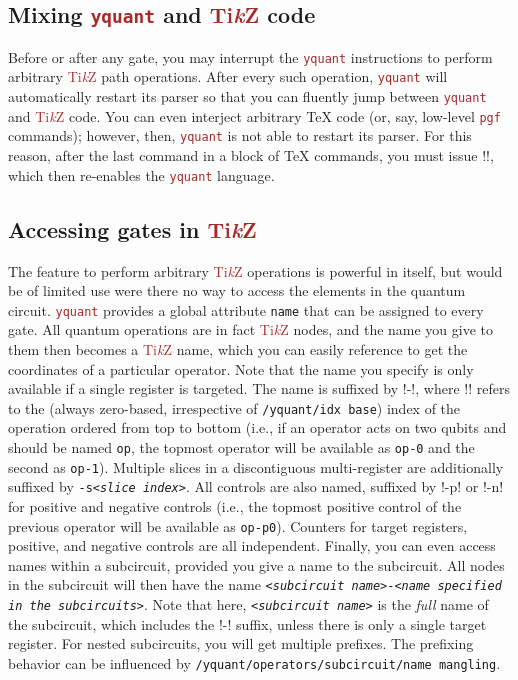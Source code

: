 \documentclass{scrartcl}
\def\TikZ{\textcolor{brown}{Ti\textit kZ}}
\def\pkg#1{\textcolor{brown}{\texttt{#1}}}
\def\ttlink{\link\texttt}
\def\Yquant{\pkg{yquant}}
\begin{document}
      \subsection{Mixing \texorpdfstring{\Yquant}{yquant} and \texorpdfstring{\TikZ}{TikZ} code}
         \linkdef\yquant
         Before or after any gate, you may interrupt the \Yquant{} instructions to perform arbitrary \TikZ{} path operations.
         After every such operation, \Yquant{} will automatically restart its parser so that you can fluently jump between \Yquant{} and \TikZ{} code.
         You can even interject arbitrary \TeX{} code (or, say, low\hyp level \pkg{pgf} commands); however, then, \Yquant{} is not able to restart its parser.
         For this reason, after the last command in a block of \TeX{} commands, you must issue \tex!\yquant!, which then re\hyp enables the \Yquant{} language.

      \subsection{Accessing gates in \texorpdfstring{\TikZ}{TikZ}}
         The feature to perform arbitrary \TikZ{} operations is powerful in itself, but would be of limited use were there no way to access the elements in the quantum circuit.
         \Yquant{} provides a global attribute \texttt{name} that can be assigned to every gate.
         All quantum operations are in fact \TikZ{} nodes, and the name you give to them then becomes a \TikZ{} name, which you can easily reference to get the coordinates of a particular operator.
         Note that the name you specify is only available if a single register is targeted.
         The name is suffixed by \tex!-\idx!, where \tex!\idx! refers to the (always zero\hyp based, irrespective of \ttlink{/yquant/idx base}) index of the operation ordered from top to bottom (i.e., if an operator acts on two qubits and should be named \texttt{op}, the topmost operator will be available as \texttt{op-0} and the second as \texttt{op-1}).
         Multiple slices in a discontiguous multi\hyp register are additionally suffixed by \texttt{-s\textit{<slice index>}}.
         All controls are also named, suffixed by \tex!-p\idx! or \tex!-n\idx! for positive and negative controls (i.e., the topmost positive control of the previous operator will be available as \texttt{op-p0}).
         Counters for target registers, positive, and negative controls are all independent.
         Finally, you can even access names within a subcircuit, provided you give a name to the subcircuit.
         All nodes in the subcircuit will then have the name \texttt{\textit{<subcircuit name>}-\textit{<name specified in the subcircuits>}}.
         Note that here, \texttt{\textit{<subcircuit name>}} is the \emph{full} name of the subcircuit, which includes the \tex!-\idx! suffix, unless there is only a single target register.
         For nested subcircuits, you will get multiple prefixes.
         The prefixing behavior can be influenced by \ttlink{/yquant/operators/subcircuit/name mangling}.
\end{document}
